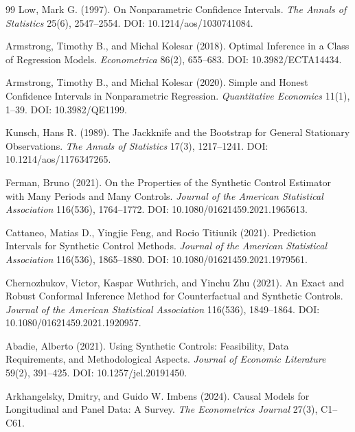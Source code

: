 \documentclass{article}
\begin{document}
\begin{thebibliography}{99}
   Low, Mark G. (1997). On Nonparametric Confidence Intervals. \emph{The Annals of Statistics} 25(6), 2547--2554. DOI: 10.1214/aos/1030741084.

   Armstrong, Timothy B., and Michal Kolesar (2018). Optimal Inference in a Class of Regression Models. \emph{Econometrica} 86(2), 655--683. DOI: 10.3982/ECTA14434.

   Armstrong, Timothy B., and Michal Kolesar (2020). Simple and Honest Confidence Intervals in Nonparametric Regression. \emph{Quantitative Economics} 11(1), 1--39. DOI: 10.3982/QE1199.

   Kunsch, Hans R. (1989). The Jackknife and the Bootstrap for General Stationary Observations. \emph{The Annals of Statistics} 17(3), 1217--1241. DOI: 10.1214/aos/1176347265.

   Ferman, Bruno (2021). On the Properties of the Synthetic Control Estimator with Many Periods and Many Controls. \emph{Journal of the American Statistical Association} 116(536), 1764--1772. DOI: 10.1080/01621459.2021.1965613.

   Cattaneo, Matias D., Yingjie Feng, and Rocio Titiunik (2021). Prediction Intervals for Synthetic Control Methods. \emph{Journal of the American Statistical Association} 116(536), 1865--1880. DOI: 10.1080/01621459.2021.1979561.

   Chernozhukov, Victor, Kaspar Wuthrich, and Yinchu Zhu (2021). An Exact and Robust Conformal Inference Method for Counterfactual and Synthetic Controls. \emph{Journal of the American Statistical Association} 116(536), 1849--1864. DOI: 10.1080/01621459.2021.1920957.

   Abadie, Alberto (2021). Using Synthetic Controls: Feasibility, Data Requirements, and Methodological Aspects. \emph{Journal of Economic Literature} 59(2), 391--425. DOI: 10.1257/jel.20191450.

   Arkhangelsky, Dmitry, and Guido W. Imbens (2024). Causal Models for Longitudinal and Panel Data: A Survey. \emph{The Econometrics Journal} 27(3), C1--C61.

\end{thebibliography}
\end{document}
